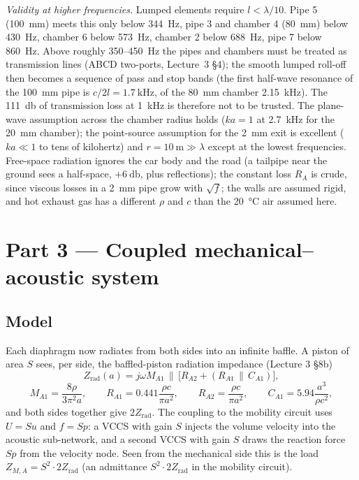 \documentclass[a4paper,11pt]{article}
\newcommand{\jw}{j\omega}
\newcommand{\Zrad}{Z_{\mathrm{rad}}}
\begin{document}
\emph{Validity at higher frequencies.} Lumped elements require $l < \lambda/10$. Pipe 5 (\SI{100}{\milli\metre}) meets
this only below \SI{344}{\hertz}, pipe 3 and chamber 4 (\SI{80}{\milli\metre}) below \SI{430}{\hertz}, chamber 6 below
\SI{573}{\hertz}, chamber 2 below \SI{688}{\hertz}, pipe 7 below \SI{860}{\hertz}. Above roughly 350--\SI{450}{\hertz} the
pipes and chambers must be treated as transmission lines (ABCD two-ports, Lecture~3 \S4); the smooth lumped roll-off then
becomes a sequence of pass and stop bands (the first half-wave resonance of the \SI{100}{\milli\metre} pipe is
$c/2l = \SI{1.7}{\kilo\hertz}$, of the \SI{80}{\milli\metre} chamber \SI{2.15}{\kilo\hertz}). The \SI{111}{\decibel} of
transmission loss at \SI{1}{\kilo\hertz} is therefore not to be trusted. The plane-wave assumption across the chamber
radius holds ($ka = 1$ at \SI{2.7}{\kilo\hertz} for the \SI{20}{\milli\metre} chamber); the point-source assumption for
the \SI{2}{\milli\metre} exit is excellent ($ka\ll 1$ to tens of kilohertz) and $r = \SI{10}{\metre}\gg\lambda$ except at
the lowest frequencies. Free-space radiation ignores the car body and the road (a tailpipe near the ground sees a
half-space, $+\SI{6}{\decibel}$, plus reflections); the constant loss $R_A$ is crude, since viscous losses in a
\SI{2}{\milli\metre} pipe grow with $\sqrt f$; the walls are assumed rigid, and hot exhaust gas has a different $\rho$
and $c$ than the \SI{20}{\celsius} air assumed here.


\FloatBarrier
\section{Part 3 --- Coupled mechanical--acoustic system}
\subsection{Model}
Each diaphragm now radiates from both sides into an infinite baffle. A piston of area $S$ sees, per side,
the baffled-piston radiation impedance (Lecture 3 \S8b)
\[
\Zrad(a) = \jw M_{A1}\,\|\,\big[R_{A2} + (R_{A1}\,\|\,C_{A1})\big],
\]
\[
M_{A1} = \frac{8\rho}{3\pi^2 a},\qquad R_{A1} = 0.441\frac{\rho c}{\pi a^2},\qquad R_{A2} = \frac{\rho c}{\pi a^2},\qquad
C_{A1} = 5.94\frac{a^3}{\rho c^2},
\]
and both sides together give $2\Zrad$. The coupling to the mobility circuit uses $U = S u$ and $f = S p$: a
VCCS with gain $S$ injects the volume velocity into the acoustic sub-network, and a second VCCS with gain $S$
draws the reaction force $S p$ from the velocity node. Seen from the mechanical side this is the load
$Z_{M,A} = S^2\cdot 2\Zrad$ (an admittance $S^2\cdot 2\Zrad$ in the mobility circuit).
\end{document}
